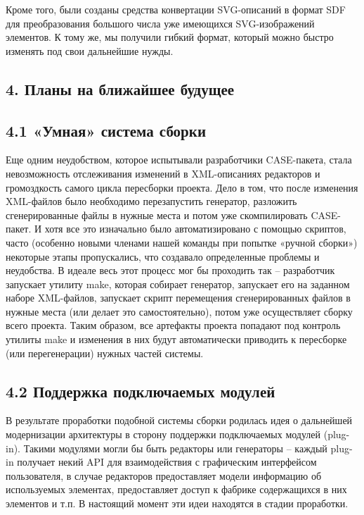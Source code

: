 \documentclass[a4paper]{article}
\begin{document}
\bigskip

{
Кроме того, были созданы средства конвертации SVG-описаний в формат SDF
для преобразования большого числа уже имеющихся SVG-изображений
элементов. К тому же, мы получили гибкий формат, который можно быстро
изменять под свои дальнейшие нужды.}


\bigskip

\subsection{4. Планы на ближайшее будущее}
\subsection{4.1 «Умная» система сборки}
{
Еще одним неудобством, которое испытывали разработчики CASE-пакета,
стала невозможность отслеживания изменений в XML-описаниях редакторов и
громоздкость самого цикла пересборки проекта. Дело в том, что после
изменения XML-файлов было необходимо перезапустить генератор, разложить
сгенерированные файлы в нужные места и потом уже скомпилировать
CASE-пакет. И хотя все это изначально было автоматизировано с помощью
скриптов, часто (особенно новыми членами нашей команды при попытке
«ручной сборки») некоторые этапы пропускались, что создавало
определенные проблемы и неудобства. В идеале весь этот процесс мог бы
проходить так – разработчик запускает утилиту make, которая собирает
генератор, запускает его на заданном наборе XML-файлов, запускает
скрипт перемещения сгенерированных файлов в нужные места (или делает
это самостоятельно), потом уже осуществляет сборку всего проекта. Таким
образом, все артефакты проекта попадают под контроль утилиты make и
изменения в них будут автоматически приводить к пересборке (или
перегенерации) нужных частей системы.}


\bigskip

\subsection{4.2 Поддержка подключаемых модулей}
{
В результате проработки подобной системы сборки родилась идея о
дальнейшей модернизации архитектуры в сторону поддержки подключаемых
модулей (plug-in). Такими модулями могли бы быть редакторы или
генераторы – каждый plug-in получает некий API для взаимодействия с
графическим интерфейсом пользователя, в случае редакторов предоставляет
модели информацию об используемых элементах, предоставляет доступ к
фабрике содержащихся в них элементов и т.п. В настоящий момент эти идеи
находятся в стадии проработки.}
\end{document}

